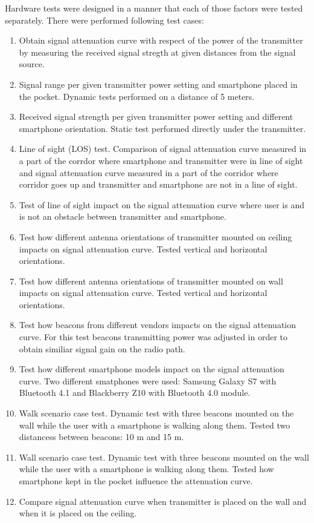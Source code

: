 \documentclass[../main.tex]{subfiles}
\begin{document}
Hardware tests were designed in a manner that each of those factors were tested separately. There were performed following test cases:

\begin{enumerate}
	\item Obtain signal attenuation curve with respect of the power of the transmitter by measuring the received signal stregth at given distances from the signal source.
	\item Signal range per given transmitter power setting and smartphone placed in the pocket. Dynamic tests performed on a distance of 5 meters.
	\item Received signal strength per given transmitter power setting and different smartphone orientation. Static test performed directly under the transmitter.
	\item Line of sight (LOS) test. Comparison of signal attenuation curve measured in a part of the corrdor where smartphone and transmitter were in line of sight and signal attenuation curve measured in a part of the corridor where corridor goes up and transmitter and smartphone are not in a line of sight.
	\item Test of line of sight impact on the signal attenuation curve where user is and is not an obstacle between transmitter and smartphone.
	\item Test how different antenna orientations of transmitter mounted on ceiling impacts on signal attenuation curve. Tested vertical and horizontal orientations.
	\item Test how different antenna orientations of transmitter mounted on wall impacts on signal attenuation curve. Tested vertical and horizontal orientations.
	\item Test how beacons from different vendors impacts on the signal attenuation curve. For this test beacons transmitting power was adjusted in order to obtain similiar signal gain on the radio path.
	\item Test how different smartphone models impact on the signal attenuation curve. Two different smatphones were used: Samsung Galaxy S7 with Bluetooth 4.1 and Blackberry Z10 with Bluetooth 4.0 module.
	\item Walk scenario case test. Dynamic test with three beacons mounted on the wall while the user with a smartphone is walking along them. Tested two distancess between beacons: 10 m and 15 m.
	\item Wall scenario case test. Dynamic test with three beacons mounted on the wall while the user with a smartphone is walking along them. Tested how smartphone kept in the pocket influence the attenuation curve.
	\item  Compare signal attenuation curve when transmitter is placed on the wall and when it is placed on the ceiling.
\end{enumerate}
\end{document}
